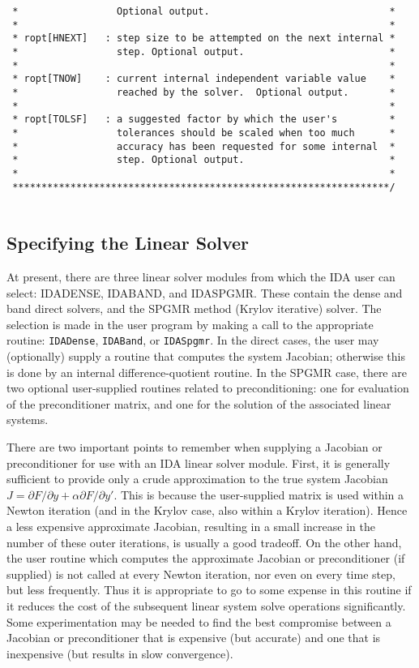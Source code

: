 \documentclass[11pt]{article}
\begin{document}
\begin{verbatim}
 *                 Optional output.                               *
 *                                                                *
 * ropt[HNEXT]   : step size to be attempted on the next internal *
 *                 step. Optional output.                         *
 *                                                                *
 * ropt[TNOW]    : current internal independent variable value    *
 *                 reached by the solver.  Optional output.       *
 *                                                                *
 * ropt[TOLSF]   : a suggested factor by which the user's         *
 *                 tolerances should be scaled when too much      *
 *                 accuracy has been requested for some internal  *
 *                 step. Optional output.                         *
 *                                                                *
 *****************************************************************/
 
\end{verbatim}
\normalsize


\subsection{Specifying the Linear Solver}

At present, there are three linear solver modules from which the IDA
user can select: IDADENSE, IDABAND, and IDASPGMR.  These contain the
dense and band direct solvers, and the SPGMR method (Krylov iterative)
solver.  The selection is made in the user program by making a call to
the appropriate routine: {\tt IDADense}, {\tt IDABand}, or
{\tt IDASpgmr}.  In the direct cases, the user may (optionally) supply
a routine that computes the system Jacobian; otherwise this is done by
an internal difference-quotient routine.  In the SPGMR case, there
are two optional user-supplied routines related to preconditioning:
one for evaluation of the preconditioner matrix, and one for the
solution of the associated linear systems.

There are two important points to remember when supplying a Jacobian or
preconditioner for use with an IDA linear solver module.  First, it is
generally sufficient to provide only a crude approximation to the true
system Jacobian
$J = \partial F / \partial y + \alpha \partial F / \partial y'$.  This
is because the user-supplied matrix is used within a Newton iteration
(and in the Krylov case, also within a Krylov iteration).  Hence a
less expensive approximate Jacobian, resulting in a small increase in
the number of these outer iterations, is usually a good tradeoff.
On the other hand, the user routine which computes the approximate
Jacobian or preconditioner (if supplied) is not called at every Newton
iteration, nor even on every time step, but less frequently.
Thus it is appropriate to go to some expense in this routine if it
reduces the cost of the subsequent linear system solve operations
significantly.  Some experimentation may be needed to find the best
compromise between a Jacobian or preconditioner that is expensive (but
accurate) and one that is inexpensive (but results in slow convergence).
\end{document}
